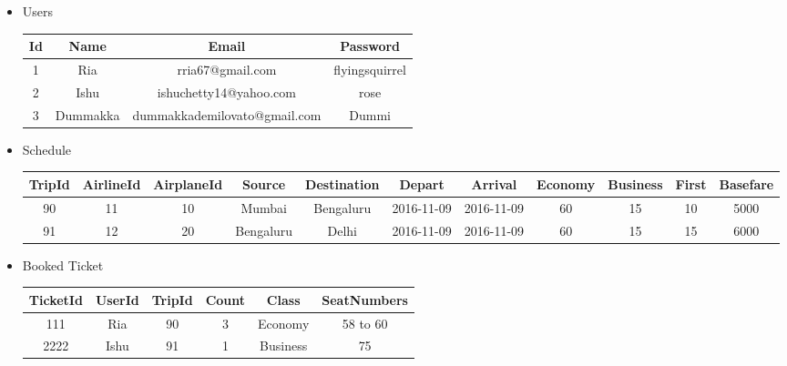 \documentclass[hidelinks=true]{article}
\begin{document}
\vspace{20pt}
\begin{flushleft}
\begin{itemize}
\item {\large{Users}}\\
\vspace{5pt}

 \begin{tabular}{|c | c | c | c | } 
 \hline
 Id & Name & Email & Password \\ [0.5ex] 
 \hline\hline
 1 & Ria & rria67@gmail.com & flyingsquirrel \\ 
 \hline
 2 & Ishu & ishuchetty14@yahoo.com & rose\\ [1ex] 
 \hline
 3 & Dummakka & dummakkademilovato@gmail.com & Dummi\\ [1ex] 
 \hline
\end{tabular}
\end{itemize}
\end{flushleft}

\vspace{20pt}
\begin{flushleft}
\begin{itemize}
\item {\large{Schedule}}
\vspace{5pt}

\tiny
 \begin{tabular}{|c |c |c |c |c |c |c |c |c |c |c |} 
 \hline
 TripId & AirlineId & AirplaneId & Source & Destination & Depart & Arrival & Economy &Business & First & Basefare \\ [0.5ex] 
 \hline\hline
 90 & 11 & 10 & Mumbai & Bengaluru & 2016-11-09 & 2016-11-09 & 60 & 15 & 10 & 5000 \\ 
 \hline
 91 & 12 & 20 & Bengaluru & Delhi & 2016-11-09 & 2016-11-09 & 60 & 15 & 15 & 6000 \\ [1ex] 
 \hline
\end{tabular}
\end{itemize}
\end{flushleft}

\vspace{20pt}
\begin{flushleft}
\begin{itemize}
\item {\large{Booked Ticket}}\\
\vspace{5pt}

 \begin{tabular}{|c | c | c | c | c | c |} 
 \hline
 TicketId & UserId & TripId & Count & Class & SeatNumbers\\ [0.5ex] 
 \hline\hline
 111 & Ria & 90 & 3 & Economy & 58 to 60 \\ 
 \hline
 2222 & Ishu & 91 & 1 & Business & 75 \\ [1ex] 
 \hline
\end{tabular}
\end{itemize}
\end{flushleft}
\end{document}
